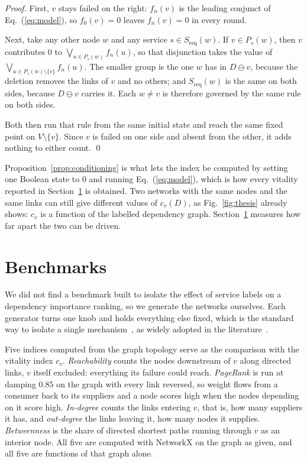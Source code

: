 \documentclass{svproc}
\begin{document}
\begin{proof}
First, $v$ stays failed on the right: $f_n(v)$ is the leading conjunct of
Eq.~(\ref{eq:model}), so $f_0(v) = 0$ leaves $f_n(v) = 0$ in every round.

Next, take any other node $w$ and any service $s \in S_{\mathrm{req}}(w)$. If
$v \in P_s(w)$, then $v$ contributes $0$ to $\bigvee_{u \in P_s(w)} f_n(u)$, so that
disjunction takes the value of $\bigvee_{u \in P_s(w) \setminus \{v\}} f_n(u)$. The
smaller group is the one $w$ has in $D \ominus v$, because the deletion removes the
links of $v$ and no others; and $S_{\mathrm{req}}(w)$ is the same on both sides,
because $D \ominus v$ carries it. Each $w \neq v$ is therefore governed by the same
rule on both sides.

Both then run that rule from the same initial state and reach the same fixed point
on $V \setminus \{v\}$. Since $v$ is failed on one side and absent from the other,
it adds nothing to either count. \qed
\end{proof}

Proposition~\ref{prop:conditioning} is what lets the index be computed by setting
one Boolean state to $0$ and running
Eq.~(\ref{eq:model}), which is how every vitality reported in
Section~\ref{sec:benchmarks} is obtained. Two networks with the same nodes and the
same links can still give different values of $c_v(D)$, as Fig.~\ref{fig:thesis}
already shows: $c_v$ is a function of the labelled dependency graph.
Section~\ref{sec:benchmarks} measures how far apart the two can be driven.

\section{Benchmarks}
\label{sec:benchmarks}

We did not find a benchmark built to isolate the effect of service labels on a
dependency importance ranking, so we generate the networks ourselves. Each generator turns one knob and holds everything else fixed,
which is the standard way to isolate a single
mechanism~\cite{lancichinetti_benchmark_2008}, as widely adopted in the
literature~\cite{bachmann_survey_2020}.

Five indices computed from the graph topology serve as the comparison with the
vitality index $c_v$. \emph{Reachability} counts the nodes downstream of $v$ along
directed links, $v$ itself excluded: everything its failure could reach.
\emph{PageRank} is run at damping $0.85$ on the graph with every link reversed, so weight flows
from a consumer back to its suppliers and a node scores high when the nodes
depending on it score high. \emph{In-degree} counts the links entering $v$, that
is, how many suppliers it has, and \emph{out-degree} the links leaving it, how many nodes it supplies. 
\emph{Betweenness} is the share of directed shortest paths running through $v$ as an
interior node. All five are computed with NetworkX on the graph as given, and all
five are functions of that graph alone.
\end{document}
